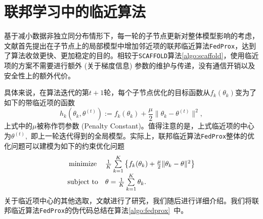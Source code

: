 \section{联邦学习中的临近算法}
\label{sec:chap2-ppa}


基于减小数据非独立同分布情形下，每一轮的子节点更新对整体模型影响的考虑，文献\parencite{sahu2018fedprox}首先提出在子节点上的局部模型中增加邻近项的联邦临近算法\texttt{FedProx}，达到了算法收敛更快、更加稳定的目的。相较于\texttt{SCAFFOLD}算法\ref{algo:scaffold}，使用临近项的方案不需要进行额外 (关于梯度信息) 参数的维护与传递，没有通信开销以及安全性上的额外代价。

具体来说，在算法迭代的第$t+1$轮，每个子节点优化的目标函数从$f_k(\theta_k)$变为了如下的带临近项的函数
\begin{equation}
\label{eq:fedprox}
h_k(\theta_k, \theta^{(t)}) := f_k(\theta_k) + \frac{\mu}{2} \lVert \theta_k - \theta^{(t)} \rVert^2,
\end{equation}
上式中的$\mu$被称作罚参数 (Penalty Constant)。值得注意的是，上式临近项的中心为$\theta^{(t)},$ 即上一轮迭代得到的全局模型。实际上，联邦临近算法\texttt{FedProx}整体的优化问题可以建模为如下的约束优化问题
\begin{equation}
\label{eq:fedprox-whole}
\begin{array}{cl}
\operatorname*{minimize} & \frac{1}{K} \sum\limits_{k=1}^K \left\{ f_k(\theta_k) + \frac{\mu}{2} \lVert \theta_k - \theta \rVert^2 \right\} \\
\text{subject to} & \theta = \frac{1}{K} \sum\limits_{k=1}^K \theta_k.
\end{array}
\end{equation}
关于临近项中心的其他选取，文献\parencite{hanzely2020federated,li_2021_ditto}进行了研究，我们随后进行详细介绍。我们将联邦临近算法\texttt{FedProx}的伪代码总结在算法\ref{algo:fedprox}~中。



